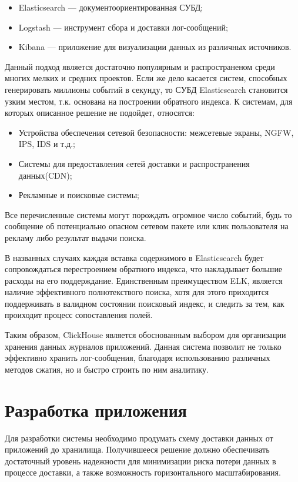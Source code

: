 \documentclass[14pt, russian]{scrartcl}
\begin{document}
\begin{itemize}
  \item Elasticsearch --- документоориентированная СУБД;
  \item Logstash --- инструмент сбора и доставки лог-сообщений;
  \item Kibana --- приложение для визуализации данных из различных источников.
\end{itemize}

Данный подход является достаточно популярным и распространеном среди многих мелких и средних проектов. Если же дело касается систем, способных генерировать миллионы событий в секунду, то СУБД Elasticsearch становится узким местом, т.к. основана на построении обратного индекса. К системам, для которых описанное решение не подойдет, относятся:

\begin{itemize}
  \item Устройства обеспечения сетевой безопасности: межсетевые экраны, NGFW, IPS, IDS и т.д.;
  \item Системы для предоставления cетей доставки и распространения данных(CDN);
  \item Рекламные и поисковые системы;
\end{itemize}

Все перечисленные системы могут порождать огромное число событий, будь то сообщение об потенциально опасном сетевом пакете или клик пользователя на рекламу либо результат выдачи поиска. 

В названных случаях каждая вставка содержимого в Elasticsearch будет сопровождаться перестроением обратного индекса, что накладывает большие расходы на его поддерждание. Единственным преимуществом ELK, является наличие эффективного полнотекствого поиска, хотя для этого приходится поддерживать в валидном состоянии поисковый индекс, и следить за тем, как проиходит процесс сопоставления полей.

Таким образом, ClickHouse является обоснованным выбором для
организации хранения данных журналов приложений.
Данная система позволит не только эффективно хранить лог-сообщения, благодаря использованию различных методов сжатия, но и быстро строить по ним
аналитику.


\section{Разработка приложения}

Для разработки системы необходимо продумать схему доставки данных от приложений
до хранилища. Получившееся решение должно обеспечивать достаточный уровень надежности
для минимизации риска потери данных в процессе доставки,
а также возможность горизонтального масштабирования.
\end{document}
